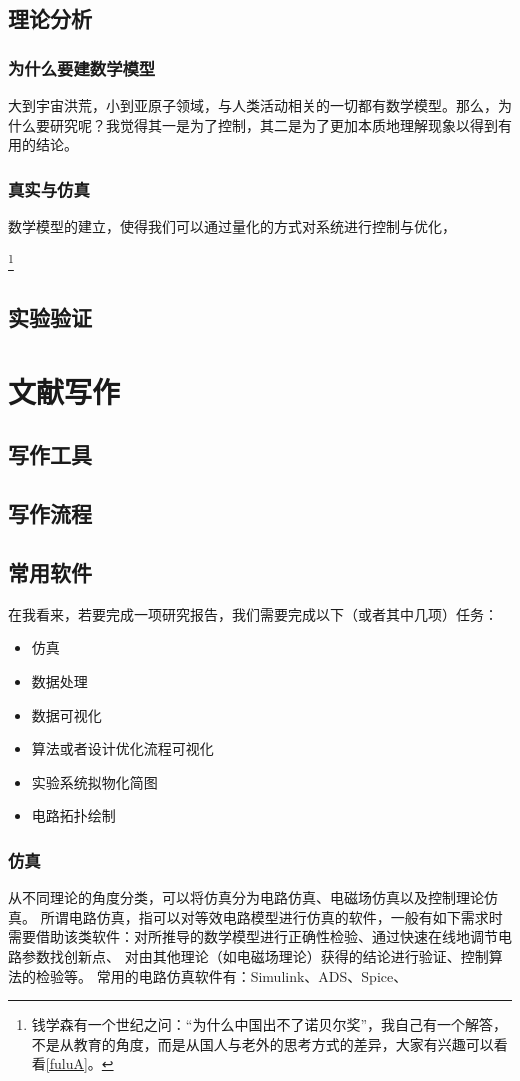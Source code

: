\documentclass[UTF8]{ctexbook}
\begin{document}
\section{理论分析}
\subsection{为什么要建数学模型}
大到宇宙洪荒，小到亚原子领域，与人类活动相关的一切都有数学模型。那么，为什么要研究呢？我觉得其一是为了控制，其二是为了更加本质地理解现象以得到有用的结论。

\subsection{真实与仿真}
数学模型的建立，使得我们可以通过量化的方式对系统进行控制与优化，

\footnote{钱学森有一个世纪之问：“为什么中国出不了诺贝尔奖”，我自己有一个解答，不是从教育的角度，而是从国人与老外的思考方式的差异，大家有兴趣可以看看\ref{fuluA}。}

\section{实验验证}

\chapter{文献写作}
\section{写作工具}
\section{写作流程}
\section{常用软件}
在我看来，若要完成一项研究报告，我们需要完成以下（或者其中几项）任务：
\begin{itemize}
	\item 仿真
	\item 数据处理
	\item 数据可视化
	\item 算法或者设计优化流程可视化
	\item 实验系统拟物化简图
	\item 电路拓扑绘制
\end{itemize}
\subsection{仿真}
从不同理论的角度分类，可以将仿真分为电路仿真、电磁场仿真以及控制理论仿真。
所谓电路仿真，指可以对等效电路模型进行仿真的软件，一般有如下需求时需要借助该类软件：对所推导的数学模型进行正确性检验、通过快速在线地调节电路参数找创新点、
对由其他理论（如电磁场理论）获得的结论进行验证、控制算法的检验等。
常用的电路仿真软件有：Simulink、ADS、Spice、
\end{document}
